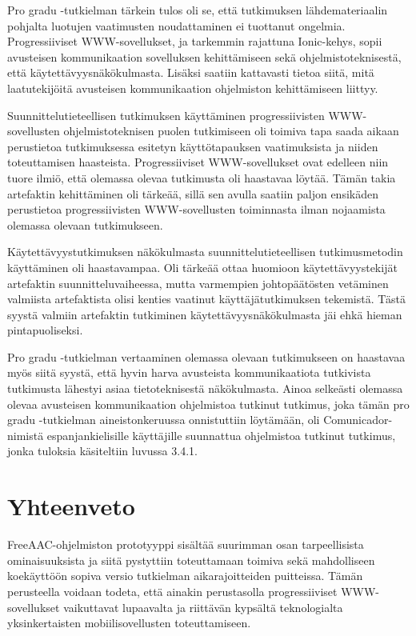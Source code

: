 \documentclass[utf8]{gradu3}
\begin{document}
Pro gradu -tutkielman tärkein tulos oli se, että tutkimuksen lähdemateriaalin pohjalta luotujen vaatimusten noudattaminen ei tuottanut ongelmia. Progressiiviset WWW-sovellukset, ja tarkemmin rajattuna Ionic-kehys, sopii avusteisen kommunikaation sovelluksen kehittämiseen sekä ohjelmistoteknisestä, että käytettävyysnäkökulmasta. Lisäksi saatiin kattavasti tietoa siitä, mitä laatutekijöitä avusteisen kommunikaation ohjelmiston kehittämiseen liittyy.

Suunnittelutieteellisen tutkimuksen käyttäminen progressiivisten WWW-sovellusten ohjelmistoteknisen puolen tutkimiseen oli toimiva tapa saada aikaan perustietoa tutkimuksessa esitetyn käyttötapauksen vaatimuksista ja niiden toteuttamisen haasteista. Progressiiviset WWW-sovellukset ovat edelleen niin tuore ilmiö, että olemassa olevaa tutkimusta oli haastavaa löytää. Tämän takia artefaktin kehittäminen oli tärkeää, sillä sen avulla saatiin paljon ensikäden perustietoa progressiivisten WWW-sovellusten toiminnasta ilman nojaamista olemassa olevaan tutkimukseen.

Käytettävyystutkimuksen näkökulmasta suunnittelutieteellisen tutkimusmetodin käyttäminen oli haastavampaa. Oli tärkeää ottaa huomioon käytettävyystekijät artefaktin suunnitteluvaiheessa, mutta varmempien johtopäätösten vetäminen valmiista artefaktista olisi kenties vaatinut käyttäjätutkimuksen tekemistä. Tästä syystä valmiin artefaktin tutkiminen käytettävyysnäkökulmasta jäi ehkä hieman pintapuoliseksi.

Pro gradu -tutkielman vertaaminen olemassa olevaan tutkimukseen on haastavaa myös siitä syystä, että hyvin harva avusteista kommunikaatiota tutkivista tutkimusta lähestyi asiaa tietoteknisestä näkökulmasta. Ainoa selkeästi olemassa olevaa avusteisen kommunikaation ohjelmistoa tutkinut tutkimus, joka tämän pro gradu -tutkielman aineistonkeruussa onnistuttiin löytämään, oli Comunicador-nimistä espanjankielisille käyttäjille suunnattua ohjelmistoa tutkinut tutkimus, jonka tuloksia käsiteltiin luvussa 3.4.1.

\chapter{Yhteenveto}

FreeAAC-ohjelmiston prototyyppi sisältää suurimman osan tarpeellisista ominaisuuksista ja siitä pystyttiin toteuttamaan toimiva sekä mahdolliseen koekäyttöön sopiva versio tutkielman aikarajoitteiden puitteissa. Tämän perusteella voidaan todeta, että ainakin perustasolla progressiiviset WWW-sovellukset vaikuttavat lupaavalta ja riittävän kypsältä teknologialta yksinkertaisten mobiilisovellusten toteuttamiseen.
\end{document}
